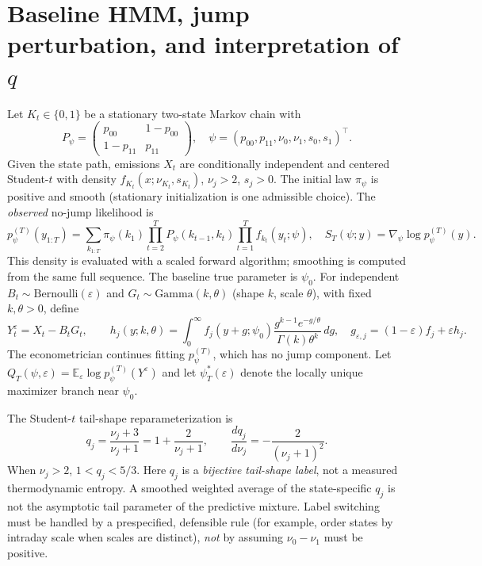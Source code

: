 \documentclass[11pt,a4paper]{article}
\newcommand{\E}{\mathbb E}
\newcommand{\eps}{\varepsilon}
\begin{document}
\section{Baseline HMM, jump perturbation, and interpretation of $q$}
Let $K_t\in\{0,1\}$ be a stationary two-state Markov chain with
\begin{equation}
P_\psi=\begin{pmatrix}p_{00}&1-p_{00}\\1-p_{11}&p_{11}\end{pmatrix},\quad
\psi=(p_{00},p_{11},\nu_0,\nu_1,s_0,s_1)^\top.\label{eq:parameters}
\end{equation}
Given the state path, emissions $X_t$ are conditionally independent and centered Student-$t$ with density $f_{K_t}(x;\nu_{K_t},s_{K_t})$, $\nu_j>2$, $s_j>0$. The initial law $\pi_\psi$ is positive and smooth (stationary initialization is one admissible choice). The \emph{observed} no-jump likelihood is
\begin{equation}
p_\psi^{(T)}(y_{1:T})=\sum_{k_{1:T}}\pi_\psi(k_1)
\prod_{t=2}^T P_\psi(k_{t-1},k_t)\prod_{t=1}^T f_{k_t}(y_t;\psi),\quad
S_T(\psi;y)=\nabla_\psi\log p_\psi^{(T)}(y).\label{eq:observed}
\end{equation}
This density is evaluated with a scaled forward algorithm; smoothing is computed from the same full sequence. The baseline true parameter is $\psi_0$. For independent $B_t\sim\mathrm{Bernoulli}(\eps)$ and $G_t\sim\mathrm{Gamma}(k,\theta)$ (shape $k$, scale $\theta$), with fixed $k,\theta>0$, define
\begin{equation}
Y_t^\eps=X_t-B_tG_t,\qquad
h_j(y;k,\theta)=\int_0^\infty f_j(y+g;\psi_0)\frac{g^{k-1}e^{-g/\theta}}{\Gamma(k)\theta^k}\,dg,\quad
g_{\eps,j}=(1-\eps)f_j+\eps h_j.\label{eq:convolution}
\end{equation}
The econometrician continues fitting $p_\psi^{(T)}$, which has no jump component. Let $Q_T(\psi,\eps)=\E_\eps\log p_\psi^{(T)}(Y^\eps)$ and let $\psi_T^*(\eps)$ denote the locally unique maximizer branch near $\psi_0$.

The Student-$t$ tail-shape reparameterization is
\begin{equation}
q_j=\frac{\nu_j+3}{\nu_j+1}=1+\frac{2}{\nu_j+1},\qquad
\frac{dq_j}{d\nu_j}=-\frac{2}{(\nu_j+1)^2}.\label{eq:qmap}
\end{equation}
When $\nu_j>2$, $1<q_j<5/3$. Here $q_j$ is a \emph{bijective tail-shape label}, not a measured thermodynamic entropy. A smoothed weighted average of the state-specific $q_j$ is not the asymptotic tail parameter of the predictive mixture. Label switching must be handled by a prespecified, defensible rule (for example, order states by intraday scale when scales are distinct), \emph{not} by assuming $\nu_0-\nu_1$ must be positive.
\end{document}

